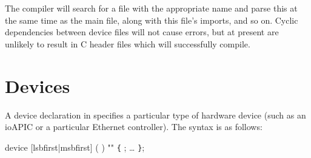 \documentclass[a4paper,11pt,twoside]{report}
\begin{document}
The \Mac compiler will search for a file with the appropriate name and
parse this at the same time as the main file, along with this file's
imports, and so on.  Cyclic dependencies between device files will not
cause errors, but at present are unlikely to result in C header files
which will successfully compile. 

\section{Devices}\label{sec:devices}

A device declaration in \Mac specifies a particular type of hardware
device (such as an ioAPIC or a particular Ethernet controller).   The
syntax is as follows:

\begin{syntax}
device  [lsbfirst|msbfirst] (  ) ""
\verb+{+
  ;
  \ldots
\verb+}+;
\end{syntax}
\end{document}
